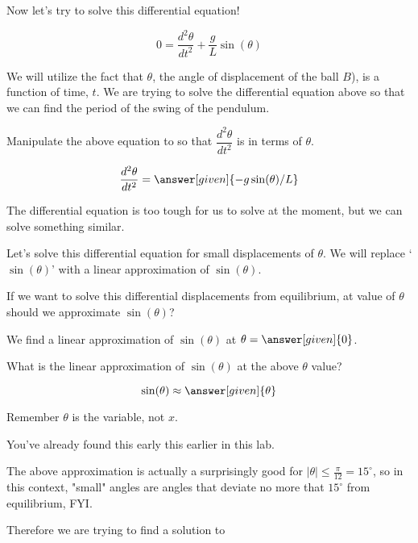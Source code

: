 \documentclass[handout,nooutcomes]{ximera}
\begin{document}
\begin{example}
\begin{explanation}
Now let's try to solve this differential equation!

\[
0 = \dfrac{d^2 \theta}{d t^2}  + \dfrac{g}{L} \sin(\theta)
\]

We will utilize the fact that $\theta$, the angle of displacement of the ball $B$),
is a function of time, $t$. We are trying to solve the differential
equation above so that we can find the period of the swing of the pendulum.

Manipulate the above equation to so that $\dfrac{d^2 \theta}{d t^2}$ is in terms of $\theta$.

\[
\dfrac{d^2 \theta}{d t^2}  = \answer[given]{-g\sin(\theta)/L}
\]

The differential equation is too tough for us to solve at the moment,
but we can solve something similar.


Let's solve this differential equation for small displacements
of $\theta$. We will replace `$\sin(\theta)$' with a linear approximation
of $\sin(\theta)$.


\begin{question}
If we want to solve this differential displacements from equilibrium, at value of $\theta$ should we approximate $\sin(\theta)$?


We find a linear approximation of $\sin(\theta)$ at $\theta = \answer[given]{0}$.

\end{question}

\begin{question}
What is the linear approximation of $\sin(\theta)$ at the above $\theta$ value?

\[
\sin(\theta) \approx \answer[given]{\theta}
\]

\begin{hint}
Remember $\theta$ is the variable, not $x$.
\end{hint}
\begin{hint}
You've already found this early this earlier in this lab.
\end{hint}
\end{question}

\begin{remark}
The above approximation is actually a surprisingly good for
$|\theta|\leq \frac{\pi}{12} = 15^\circ$, so in this context, "small" angles
are angles that deviate no more that $15^\circ$ from equilibrium, FYI.
\end{remark}

Therefore we are trying to find a solution to


\end{explanation}
\end{example}
\end{document}

